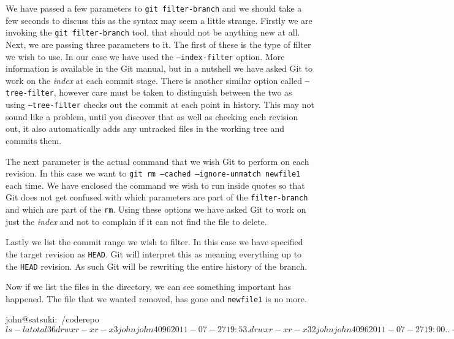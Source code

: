 We have passed a few parameters to \texttt{git filter-branch} and we should take a few seconds to discuss this as the syntax may seem a little strange.
Firstly we are invoking the \texttt{git filter-branch} tool, that should not be anything new at all.
Next, we are passing three parameters to it.
The first of these is the type of filter we wish to use.
In our case we have used the \texttt{--index-filter} option.
More information is available in the Git manual, but in a nutshell we have asked Git to work on the \emph{index} at each commit stage.
There is another similar option called \texttt{--tree-filter}, however care must be taken to distinguish between the two as using \texttt{--tree-filter} checks out the commit at each point in history.
This may not sound like a problem, until you discover that as well as checking each revision out, it also automatically adds any untracked files in the working tree and commits them.

The next parameter is the actual command that we wish Git to perform on each revision.
In this case we want to \texttt{git rm --cached --ignore-unmatch newfile1} each time.
We have enclosed the command we wish to run inside quotes so that Git does not get confused with which parameters are part of the \texttt{filter-branch} and which are part of the \texttt{rm}.
Using these options we have asked Git to work on just the \emph{index} and not to complain if it can not find the file to delete.

Lastly we list the commit range we wish to filter.
In this case we have specified the target revision as \texttt{HEAD}.
Git will interpret this as meaning everything up to the \texttt{HEAD} revision.
As such Git will be rewriting the entire history of the branch.

Now if we list the files in the directory, we can see something important has happened.
The file that we wanted removed, has gone and \texttt{newfile1} is no more.

\begin{code}
john@satsuki:~/coderepo$ ls -la
total 36
drwxr-xr-x  3 john john 4096 2011-07-27 19:53 .
drwxr-xr-x 32 john john 4096 2011-07-27 19:00 ..
-rw-r--r--  1 john john   35 2011-07-22 07:15 another_file
-rw-r--r--  1 john john   25 2011-07-22 07:15 cont_dev
drwxrwxr-x  9 john john 4096 2011-07-27 19:53 .git
-rw-r--r--  1 john john   58 2011-07-22 07:15 newfile2
-rw-r--r--  1 john john   45 2011-07-22 07:15 newfile3
-rw-r--r--  1 john john    8 2011-03-31 22:15 temp_file
-rwxrwxr-x  1 john john  114 2011-07-21 21:17 test.sh
john@satsuki:~/coderepo$
\end{code}

